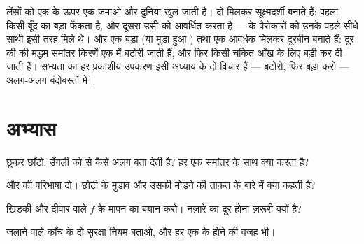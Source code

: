 \begin{remark}\label{rem:g8:lenses-images:instruments}
लेंसों को एक के ऊपर एक जमाओ और दुनिया खुल जाती है। दो 
मिलकर सूक्ष्मदर्शी बनाते हैं: पहला किसी बूँद का बड़ा 
फेंकता है, और दूसरा उसी  को आवर्धित करता है ---  के
पैरोकारों को उनके पहले सीधे साथी इसी तरह मिले थे। और एक बड़ा  (या
मुड़ा हुआ ) तथा एक आवर्धक मिलकर दूरबीन बनाते हैं: दूर की 
की मद्धम समांतर किरणें एक  में बटोरी जाती हैं, और
फिर किसी चकित आँख के लिए बड़ी कर दी जाती हैं। सभ्यता का हर प्रकाशीय
उपकरण इसी अध्याय के दो विचार हैं --- बटोरो, फिर बड़ा करो --- अलग-अलग
बंदोबस्तों में।
\end{remark}

\section{अभ्यास}

\begin{exercise}[$\star$]\label{exo:g8:lenses-images:1}
छूकर छाँटो: उँगली  को  से कैसे अलग बता देती है?
हर एक समांतर  के साथ क्या करता है?
\end{exercise}

\begin{exercise}[$\star$]\label{exo:g8:lenses-images:2}
 और  की परिभाषा दो। छोटी   के मुड़ाव और उसकी
मोड़ने की ताक़त के बारे में क्या कहती है?
\end{exercise}

\begin{exercise}[$\star$]\label{exo:g8:lenses-images:3}
खिड़की-और-दीवार वाले $f$ के मापन का बयान करो। नज़ारे का दूर होना
ज़रूरी क्यों है?
\end{exercise}

\begin{exercise}[$\star$]\label{exo:g8:lenses-images:4}
जलाने वाले काँच के दो सुरक्षा नियम बताओ, और हर एक के होने की वजह भी।
\end{exercise}

